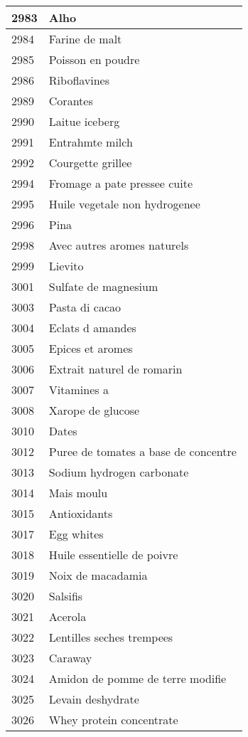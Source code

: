 \begin{longtable}{|l|l|}
2983 & Alho \\ \hline 
2984 & Farine de malt \\ \hline 
2985 & Poisson en poudre \\ \hline 
2986 & Riboflavines \\ \hline 
2989 & Corantes \\ \hline 
2990 & Laitue iceberg \\ \hline 
2991 & Entrahmte milch \\ \hline 
2992 & Courgette grillee \\ \hline 
2994 & Fromage a pate pressee cuite \\ \hline 
2995 & Huile vegetale non hydrogenee \\ \hline 
2996 & Pina \\ \hline 
2998 & Avec autres aromes naturels \\ \hline 
2999 & Lievito \\ \hline 
3001 & Sulfate de magnesium \\ \hline 
3003 & Pasta di cacao \\ \hline 
3004 & Eclats d amandes \\ \hline 
3005 & Epices et aromes \\ \hline 
3006 & Extrait naturel de romarin \\ \hline 
3007 & Vitamines a \\ \hline 
3008 & Xarope de glucose \\ \hline 
3010 & Dates \\ \hline 
3012 & Puree de tomates a base de concentre \\ \hline 
3013 & Sodium hydrogen carbonate \\ \hline 
3014 & Mais moulu \\ \hline 
3015 & Antioxidants \\ \hline 
3017 & Egg whites \\ \hline 
3018 & Huile essentielle de poivre \\ \hline 
3019 & Noix de macadamia \\ \hline 
3020 & Salsifis \\ \hline 
3021 & Acerola \\ \hline 
3022 & Lentilles seches trempees \\ \hline 
3023 & Caraway \\ \hline 
3024 & Amidon de pomme de terre modifie \\ \hline 
3025 & Levain deshydrate \\ \hline 
3026 & Whey protein concentrate \\ \hline 

\end{longtable}

